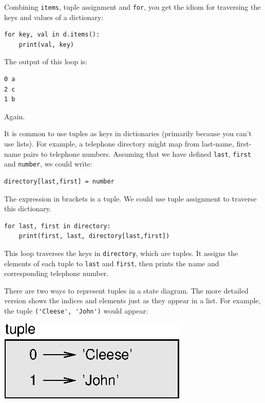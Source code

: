 \documentclass[10pt]{book}
\begin{document}


Combining {\tt items}, tuple assignment and {\tt for}, you
get the idiom for traversing the keys and values of a dictionary:

\beforeverb
\begin{verbatim}
for key, val in d.items():
    print(val, key)
\end{verbatim}
\afterverb
%
The output of this loop is:

\beforeverb
\begin{verbatim}
0 a
2 c
1 b
\end{verbatim}
\afterverb
%
Again.


It is common to use tuples as keys in dictionaries (primarily because
you can't use lists).  For example, a telephone directory might map
from last-name, first-name pairs to telephone numbers.  Assuming
that we have defined {\tt last}, {\tt first} and {\tt number}, we
could write:

\beforeverb
\begin{verbatim}
directory[last,first] = number
\end{verbatim}
\afterverb
%
The expression in brackets is a tuple.  We could use tuple
assignment to traverse this dictionary.


\beforeverb
\begin{verbatim}
for last, first in directory:
    print(first, last, directory[last,first])
\end{verbatim}
\afterverb
%
This loop traverses the keys in {\tt directory}, which are tuples.  It
assigns the elements of each tuple to {\tt last} and {\tt first}, then
prints the name and corresponding telephone number.

There are two ways to represent tuples in a state diagram.  The more
detailed version shows the indices and elements just as they appear in
a list.  For example, the tuple \verb"('Cleese', 'John')" would appear:


\beforefig
\centerline{\includegraphics{figs/tuple1.eps}}
\afterfig
\end{document}
